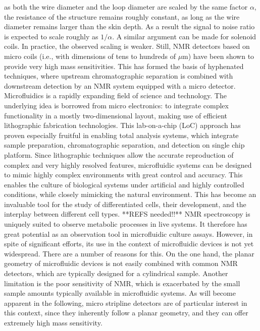 as both the wire diameter and the loop diameter are scaled by the same factor $\alpha$, the 
resistance of the structure remains roughly constant, as long as the wire diameter remains larger than 
the skin depth. As a result the signal to noise ratio is expected to scale roughly as $1/\alpha$. A 
similar argument can be made for solenoid coils. In practice, the observed scaling is weaker. Still, 
NMR detectors based on micro coils (i.e., with dimensions of tens to hundreds of $\mu$m) have been shown 
to provide very high mass sensitivities. This has formed the basis of hyphenated techniques, where 
upstream chromatographic separation is combined with downstream detection by an NMR system equipped 
with a micro detector.\cite{webb2005nmr}
Microfluidics is a rapidly expanding field of science and technology. The underlying idea is borrowed 
from micro electronics: to integrate complex functionality in a mostly two-dimensional layout, making 
use of efficient lithographic fabrication technologies. This lab-on-a-chip (LoC) approach has proven 
especially fruitful in enabling total analysis systems, which integrate sample preparation, 
chromatographic separation, and detection on single chip platform.\cite{Manz:1990vc}
Since lithographic techniques allow the accurate reproduction of complex and very highly resolved 
features, microfluidic systems can be designed to mimic highly complex environments with great control 
and accuracy. This enables the culture of biological systems under artificial and highly controlled 
conditions, while closely mimicking the natural environment. This has become an invaluable tool for the 
study of  differentiated cells, their development, and the interplay between different cell types. 
{**REFS needed!!**}
NMR spectroscopy is uniquely suited to observe metabolic processes in live systems. It therefore has 
great potential as an observation tool in microfluidic culture assays. However, in spite of significant 
efforts, its use in the context of microfluidic devices is not yet widespread. There are a number of 
reasons for this. On the one hand, the planar geometry of microfluidic devices is not easily combined 
with common NMR detectors, which are typically designed for a cylindrical sample. Another limitation is 
the poor sensitivity of NMR, which is exacerbated by the small sample amounts typically available in 
microfluidic systems. As will become apparent in the following, micro stripline detectors are of 
particular interest in this context, since they inherently follow a planar geometry, and they can offer 
extremely high mass sensitivity.
